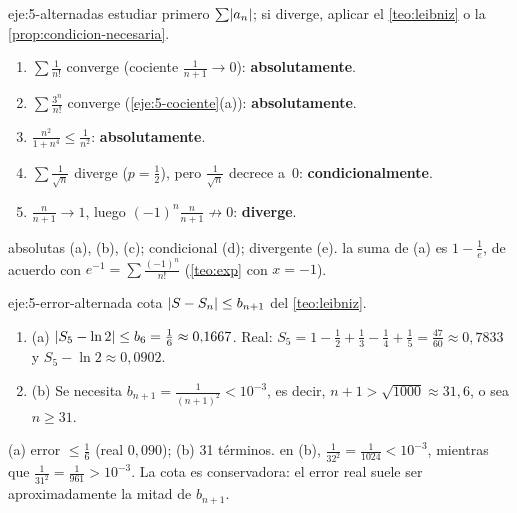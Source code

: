 \begin{solucion}{eje:5-alternadas}
\planteamiento estudiar primero $\sum\lvert a_n\rvert$; si diverge, aplicar el \cref{teo:leibniz} o la \cref{prop:condicion-necesaria}.
\pasos
\begin{enumerate}[label=(\alph*)]
  \item $\sum\frac{1}{n!}$ converge (cociente $\frac{1}{n+1}\to0$): \textbf{absolutamente}.
  \item $\sum\frac{3^{n}}{n!}$ converge (\cref{eje:5-cociente}(a)): \textbf{absolutamente}.
  \item $\frac{n^{2}}{1+n^{4}}\le\frac{1}{n^{2}}$: \textbf{absolutamente}.
  \item $\sum\frac{1}{\sqrt n}$ diverge ($p=\frac12$), pero $\frac{1}{\sqrt n}$ decrece a~$0$: \textbf{condicionalmente}.
  \item $\frac{n}{n+1}\to1$, luego $(-1)^{n}\frac{n}{n+1}\not\to0$: \textbf{diverge}.
\end{enumerate}
\resultado absolutas (a), (b), (c); condicional (d); divergente (e).
\comprobacion la suma de (a) es $1-\frac1e$, de acuerdo con $e^{-1}=\sum\frac{(-1)^{n}}{n!}$ (\cref{teo:exp} con $x=-1$).
\end{solucion}

\begin{solucion}{eje:5-error-alternada}
\planteamiento cota $\lvert S-S_n\rvert\le b_{n+1}$ del \cref{teo:leibniz}.
\pasos
\begin{enumerate}[label=\arabic*.]
  \item (a) $\lvert S_5-\ln2\rvert\le b_6=\frac16\approx0{,}1667$. Real: $S_5=1-\frac12+\frac13-\frac14+\frac15=\frac{47}{60}\approx0{,}7833$ y $S_5-\ln2\approx0{,}0902$.
  \item (b) Se necesita $b_{n+1}=\frac{1}{(n+1)^{2}}<10^{-3}$, es decir, $n+1>\sqrt{1000}\approx31{,}6$, o sea $n\ge31$.
\end{enumerate}
\resultado (a) error $\le\frac16$ (real $0{,}090$); (b) 31 términos.
\comprobacion en (b), $\frac{1}{32^{2}}=\frac{1}{1024}<10^{-3}$, mientras que $\frac{1}{31^{2}}=\frac{1}{961}>10^{-3}$. La cota es conservadora: el error real suele ser aproximadamente la mitad de $b_{n+1}$.
\end{solucion}

